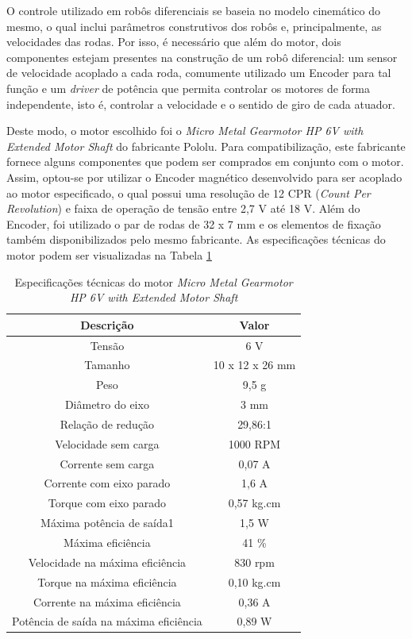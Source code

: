 O controle utilizado em robôs diferenciais se baseia no modelo cinemático do mesmo, o qual inclui parâmetros construtivos dos robôs e, principalmente, as velocidades das rodas. Por isso, é necessário que além do motor, dois componentes estejam presentes na construção de um robô diferencial: um sensor de velocidade acoplado a cada roda, comumente utilizado um Encoder para tal função e um \textit{driver} de potência que permita controlar os motores de forma independente, isto é, controlar a velocidade e o sentido de giro de cada atuador.

Deste modo, o motor escolhido foi o \textit{Micro Metal Gearmotor HP 6V with Extended Motor Shaft} do fabricante Pololu. Para compatibilização, este fabricante fornece alguns componentes que podem ser comprados em conjunto com o motor. Assim, optou-se por utilizar o Encoder magnético desenvolvido para ser acoplado ao motor especificado, o qual possui uma resolução de 12 CPR (\textit{Count Per Revolution}) e faixa de operação de tensão entre 2,7 V até 18 V. Além do Encoder, foi utilizado o par de rodas de 32 x 7 mm e os elementos de fixação também disponibilizados pelo mesmo fabricante. As especificações técnicas do motor podem ser visualizadas na Tabela \ref{tab:especificacao_do_motor}

\begin{table}[H]
	\centering
	\captionsetup{justification=centering}
	\caption{Especificações técnicas do motor \textit{Micro Metal Gearmotor HP 6V with Extended Motor Shaft}}
	\label{tab:especificacao_do_motor}
	\begin{tabular}{c|c}
		\hline
		\textbf{Descrição} & \textbf{Valor} \\ \hline
		Tensão & 6 V \\ \hline
		Tamanho & 10 x 12 x 26 mm \\ \hline
		Peso & 9,5 g \\ \hline
		Diâmetro do eixo & 3 mm \\ \hline
		Relação de redução & 29,86:1 \\ \hline
		Velocidade sem carga & 1000 RPM \\ \hline
		Corrente sem carga & 0,07 A \\ \hline
		Corrente com eixo parado & 1,6 A \\ \hline
		Torque com eixo parado & 0,57 kg.cm \\ \hline
		Máxima potência de saída1 & 1,5 W \\ \hline
		Máxima eficiência & 41 \% \\ \hline
		Velocidade na máxima eficiência & 830 rpm \\ \hline
		Torque na máxima eficiência & 0,10 kg.cm \\ \hline
		Corrente na máxima eficiência & 0,36 A \\ \hline
		Potência de saída na máxima eficiência & 0,89 W \\ \hline
	\end{tabular}
\end{table}

